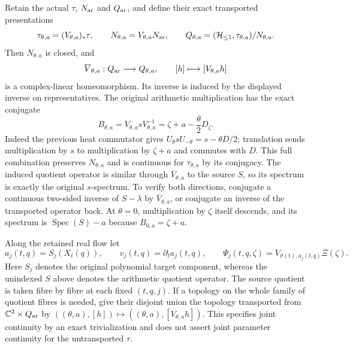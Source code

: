 Retain the actual $\tau$, $N_{\rm ar}$ and $Q_{\rm ar}$, and define their exact
transported presentations
\begin{equation}
 \tau_{\theta,a}=(V_{\theta,a})_*\tau,\qquad
 N_{\theta,a}=V_{\theta,a}N_{\rm ar},\qquad
 Q_{\theta,a}=(\mathcal H_{\leq 1},\tau_{\theta,a})/N_{\theta,a}.
 \label{csq:eq-flow-moving-source}
\end{equation}
Then $N_{\theta,a}$ is closed, and
\[
 \overline V_{\theta,a}:Q_{\rm ar}\longrightarrow Q_{\theta,a},
 \qquad[h]\longmapsto[V_{\theta,a}h]
\]
is a complex-linear homeomorphism. Its inverse is induced by the
displayed inverse on representatives. The original arithmetic
multiplication has the exact conjugate
\begin{equation}
 B_{\theta,a}=V_{\theta,a}sV_{\theta,a}^{-1}
              =\zeta+a-\frac{\theta}{2}D_\zeta .
 \label{csq:eq-flow-spectral-generator}
\end{equation}
Indeed the previous heat commutator gives
$U_\theta sU_{-\theta}=s-\theta D/2$; translation sends multiplication
by $s$ to multiplication by $\zeta+a$ and commutes with $D$.
This full combination preserves $N_{\theta,a}$ and is continuous for
$\tau_{\theta,a}$ by its conjugacy. The induced quotient operator is
similar through $\overline V_{\theta,a}$ to the source $S$, so its
spectrum is exactly the original $s$-spectrum. To verify both
directions, conjugate a continuous two-sided inverse of $S-\lambda$
by $\overline V_{\theta,a}$, or conjugate an inverse of the transported
operator back. At $\theta=0$, multiplication by $\zeta$ itself
descends, and its spectrum is $\operatorname{Spec}(S)-a$ because
$B_{0,a}=\zeta+a$.

Along the retained real flow let
\[
 a_j(t,q)=S_j(X_t(q)),\qquad
 v_j(t,q)=\partial_ta_j(t,q),\qquad
 \Psi_j(t,q,\zeta)=V_{\vartheta(t),a_j(t,q)}\Xi(\zeta).
\]
Here $S_j$ denotes the original polynomial target component, whereas
the unindexed $S$ above denotes the arithmetic quotient operator.
The source quotient is taken fibre by fibre at each fixed $(t,q,j)$.
If a topology on the whole family of quotient fibres is needed, give
their disjoint union the topology transported from
$\mathbb C^2\times Q_{\rm ar}$ by
$((\theta,a),[h])\mapsto((\theta,a),[V_{\theta,a}h])$.
This specifies joint continuity by an exact trivialization and does
not assert joint parameter continuity for the untransported $\tau$.

